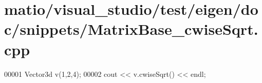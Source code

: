 \hypertarget{matio_2visual__studio_2test_2eigen_2doc_2snippets_2_matrix_base__cwise_sqrt_8cpp_source}{}\section{matio/visual\+\_\+studio/test/eigen/doc/snippets/\+Matrix\+Base\+\_\+cwise\+Sqrt.cpp}
\label{matio_2visual__studio_2test_2eigen_2doc_2snippets_2_matrix_base__cwise_sqrt_8cpp_source}

\begin{DoxyCode}
00001 Vector3d v(1,2,4);
00002 cout << v.cwiseSqrt() << endl;
\end{DoxyCode}
